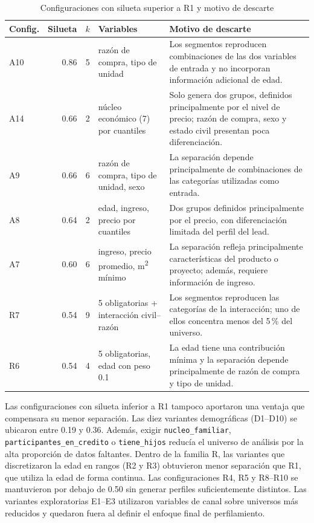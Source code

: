 \begin{table}[H]
\centering
\caption{Configuraciones con silueta superior a R1 y motivo de descarte}
\label{anx:cuad-km-descarte}
\small
\begin{tabular}{p{1.15cm}rrp{4.3cm}p{5.4cm}}
\hline
\textbf{Config.} & \textbf{Silueta} & \textbf{$k$} & \textbf{Variables} & \textbf{Motivo de descarte} \\
\hline
A10 & 0.86 & 5 & razón de compra, tipo de unidad & Los segmentos reproducen combinaciones de las dos variables de entrada y no incorporan información adicional de edad. \\
A14 & 0.66 & 2 & núcleo económico (7) por cuantiles & Solo genera dos grupos, definidos principalmente por el nivel de precio; razón de compra, sexo y estado civil presentan poca diferenciación. \\
A9  & 0.66 & 6 & razón de compra, tipo de unidad, sexo & La separación depende principalmente de combinaciones de las categorías utilizadas como entrada. \\
A8  & 0.64 & 2 & edad, ingreso, precio por cuantiles & Dos grupos definidos principalmente por el precio, con diferenciación limitada del perfil del lead. \\
A7  & 0.60 & 6 & ingreso, precio promedio, m\textsuperscript{2} mínimo & La separación refleja principalmente características del producto o proyecto; además, requiere información de ingreso. \\
R7  & 0.54 & 9 & 5 obligatorias + interacción civil--razón & Los segmentos reproducen las categorías de la interacción; uno de ellos concentra menos del 5\,\% del universo. \\
R6  & 0.54 & 4 & 5 obligatorias, edad con peso 0.1 & La edad tiene una contribución mínima y la separación depende principalmente de razón de compra y tipo de unidad. \\
\hline
\end{tabular}
\fuentepropia
\end{table}

Las configuraciones con silueta inferior a R1 tampoco aportaron una ventaja que
compensara su menor separación. Las diez variantes demográficas (D1--D10) se
ubicaron entre 0.19 y 0.36. Además, exigir \texttt{nucleo\_familiar},
\texttt{participantes\_en\_credito} o \texttt{tiene\_hijos} reducía el universo de
análisis por la alta proporción de datos faltantes. Dentro de la familia R, las
variantes que discretizaron la edad en rangos (R2 y R3) obtuvieron menor separación
que R1, que utiliza la edad de forma continua. Las configuraciones R4, R5 y R8--R10
se mantuvieron por debajo de 0.50 sin generar perfiles suficientemente distintos.
Las variantes exploratorias E1--E3 utilizaron variables de canal sobre universos más
reducidos y quedaron fuera al definir el enfoque final de perfilamiento.

